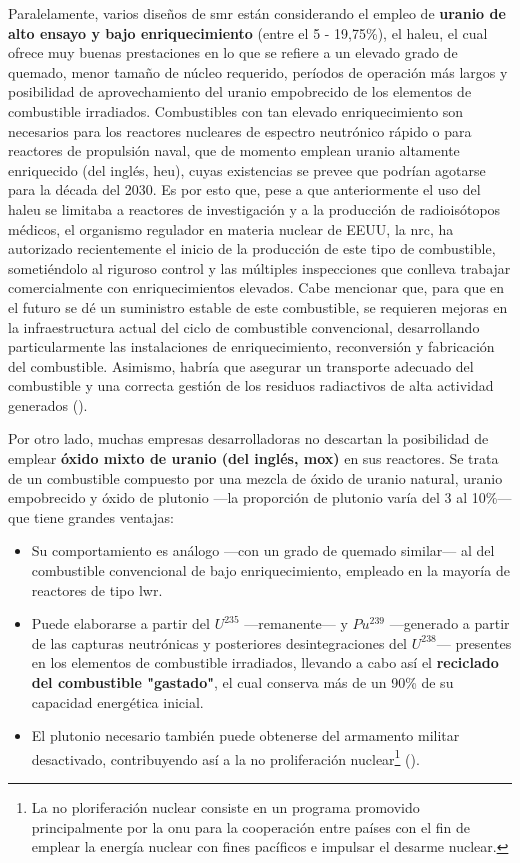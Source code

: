 Paralelamente, varios diseños de \acrshort{smr} están considerando el empleo de \textbf{uranio de alto ensayo y bajo enriquecimiento} (entre el 5 - 19,75\%), el \acrfull{haleu}, el cual ofrece muy buenas prestaciones en lo que se refiere a un elevado grado de quemado, menor tamaño de núcleo requerido, períodos de operación más largos y posibilidad de aprovechamiento del uranio empobrecido de los elementos de combustible irradiados. Combustibles con tan elevado enriquecimiento son necesarios para los reactores nucleares de espectro neutrónico rápido o para reactores de propulsión naval, que de momento emplean uranio altamente enriquecido (del inglés, \acrshort{heu}), cuyas existencias se prevee que podrían agotarse para la década del 2030. Es por esto que, pese a que anteriormente el uso del \acrshort{haleu} se limitaba a reactores de investigación y a la producción de radioisótopos médicos, el organismo regulador en materia nuclear de EEUU, la \acrfull{nrc}, ha autorizado recientemente el inicio de la producción de este tipo de combustible, sometiéndolo al riguroso control y las múltiples inspecciones que conlleva trabajar comercialmente con enriquecimientos elevados.  Cabe mencionar que, para que en el futuro se dé un suministro estable de este combustible, se requieren mejoras en la infraestructura actual del ciclo de combustible convencional, desarrollando particularmente las instalaciones de enriquecimiento, reconversión y fabricación del combustible. Asimismo, habría que asegurar un transporte adecuado del combustible y una correcta gestión de los residuos radiactivos de alta actividad generados (\cite{nrc_haleu}). 

Por otro lado, muchas empresas desarrolladoras no descartan la posibilidad de emplear \textbf{óxido mixto de uranio (del inglés, \acrshort{mox})} en sus reactores. Se trata de un combustible compuesto por una mezcla de óxido de uranio natural, uranio empobrecido y óxido de plutonio ---la proporción de plutonio varía del 3 al 10\%--- que tiene grandes ventajas:

\begin{itemize}
  \item Su comportamiento es análogo ---con un grado de quemado similar--- al del combustible convencional de bajo enriquecimiento, empleado en la mayoría de reactores de tipo \acrshort{lwr}.
  \item Puede elaborarse a partir del $U^{235}$ ---remanente--- y $Pu^{239}$ ---generado a partir de las capturas neutrónicas y posteriores desintegraciones del $U^{238}$--- presentes en los elementos de combustible irradiados, llevando a cabo así el \textbf{reciclado del combustible "gastado"}, el cual conserva más de un 90\% de su capacidad energética inicial. 
  \item El plutonio necesario también puede obtenerse del armamento militar desactivado, contribuyendo así a la \gls{no prolifera}ción nuclear\footnote{La no ploriferación nuclear consiste en un programa promovido principalmente por la \acrshort{onu} para la cooperación entre países con el fin de emplear la energía nuclear con fines pacíficos e impulsar el desarme nuclear.} (\cite{wna_mox}).
\end{itemize}

